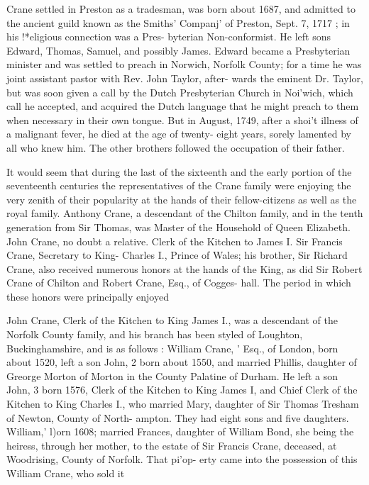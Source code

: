 \documentclass{book}
\begin{document}
Crane settled in Preston as a tradesman, was born about 1687, 
and admitted to the ancient guild known as the Smiths' Companj' 
of Preston, Sept. 7, 1717 ; in his !*eligious connection was a Pres- 
byterian Non-conformist. He left sons Edward, Thomas, Samuel, 
and possibly James. Edward became a Presbyterian minister 
and was settled to preach in Norwich, Norfolk County; for a 
time he was joint assistant pastor with Rev. John Taylor, after- 
wards the eminent Dr. Taylor, but was soon given a call by the 
Dutch Presbyterian Church in Noi'wich, which call he accepted, 
and acquired the Dutch language that he might preach to them 
when necessary in their own tongue. But in August, 1749, after 
a shoi't illness of a malignant fever, he died at the age of twenty- 
eight years, sorely lamented by all who knew him. The other 
brothers followed the occupation of their father. 

It would seem that during the last of the sixteenth and the 
early portion of the seventeenth centuries the representatives of 
the Crane family were enjoying the very zenith of their popularity 
at the hands of their fellow-citizens as well as the royal family. 
Anthony Crane, a descendant of the Chilton family, and in the 
tenth generation from Sir Thomas, was Master of the Household 
of Queen Elizabeth. John Crane, no doubt a relative. Clerk of 
the Kitchen to James I. Sir Francis Crane, Secretary to King- 
Charles I., Prince of Wales; his brother, Sir Richard Crane, 
also received numerous honors at the hands of the King, as did 
Sir Robert Crane of Chilton and Robert Crane, Esq., of Cogges- 
hall. The period in which these honors were principally enjoyed 

John Crane, Clerk of the Kitchen to King James I., was a 
descendant of the Norfolk County family, and his branch has 
been styled of Loughton, Buckinghamshire, and is as follows : 
William Crane, ' Esq., of London, born about 1520, left a son 
John, 2 born about 1550, and married Phillis, daughter of Greorge 
Morton of Morton in the County Palatine of Durham. He left a 
son John, 3 born 1576, Clerk of the Kitchen to King James I, and 
Chief Clerk of the Kitchen to King Charles I., who married Mary, 
daughter of Sir Thomas Tresham of Newton, County of North- 
ampton. They had eight sons and five daughters. William,' 
l)orn 1608; married Frances, daughter of William Bond, she 
being the heiress, through her mother, to the estate of Sir Francis 
Crane, deceased, at Woodrising, County of Norfolk. That pi'op- 
erty came into the possession of this William Crane, who sold it 
\end{document}
